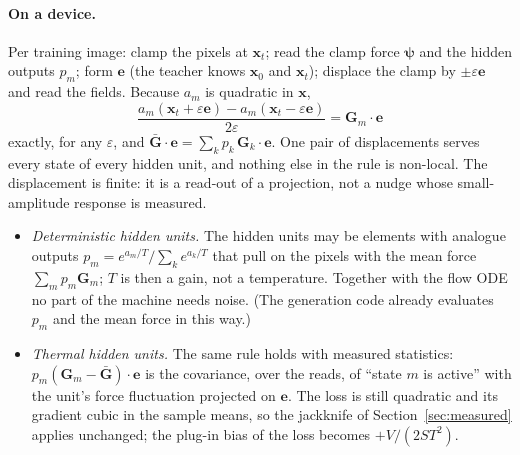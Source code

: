 \documentclass[11pt,a4paper]{article}
\newcommand{\vx}{\bm{x}}
\begin{document}
\paragraph{On a device.} Per training image: clamp the pixels at $\vx_t$; read the clamp force $\bm\psi$ and the
hidden outputs $p_m$; form $\bm e$ (the teacher knows $\vx_0$ and $\vx_t$); displace the clamp by
$\pm\varepsilon\bm e$ and read the fields. Because $a_m$ is quadratic in $\vx$,
\begin{equation}
  \frac{a_m(\vx_t+\varepsilon\bm e)-a_m(\vx_t-\varepsilon\bm e)}{2\varepsilon}=\bm G_m\cdot\bm e
\end{equation}
exactly, for any $\varepsilon$, and $\bar{\bm G}\cdot\bm e=\sum_kp_k\,\bm G_k\cdot\bm e$. One pair of displacements
serves every state of every hidden unit, and nothing else in the rule is non-local. The displacement is finite: it
is a read-out of a projection, not a nudge whose small-amplitude response is measured.
\begin{itemize}
\item \emph{Deterministic hidden units.} The hidden units may be elements with analogue outputs
  $p_m=e^{a_m/T}/\sum_ke^{a_k/T}$ that pull on the pixels with the mean force $\sum_mp_m\bm G_m$; $T$ is then a
  gain, not a temperature. Together with the flow ODE no part of the machine needs noise. (The generation code
  already evaluates $p_m$ and the mean force in this way.)
\item \emph{Thermal hidden units.} The same rule holds with measured statistics:
  $p_m(\bm G_m-\bar{\bm G})\cdot\bm e$ is the covariance, over the reads, of ``state $m$ is active'' with the unit's
  force fluctuation projected on $\bm e$. The loss is still quadratic and its gradient cubic in the sample means,
  so the jackknife of Section~\ref{sec:measured} applies unchanged; the plug-in bias of the loss becomes
  $+V/(2ST^2)$.
\end{itemize}
\end{document}
